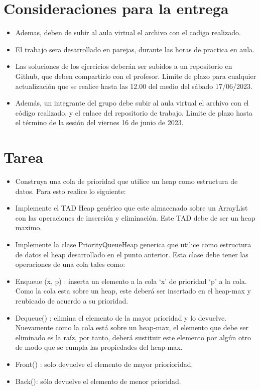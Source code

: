 \documentclass{article}
\begin{document}
	\section{Consideraciones para la entrega}
	\begin{itemize}
		\item Ademas, deben de subir al aula virtual el archivo con el codigo realizado.
		\item El trabajo sera desarrollado en parejas, durante las horas de practica en aula.
		\item Las soluciones de los ejercicios deberán ser subidos a un repositorio en Github, que deben compartirlo
con el profesor. Limite de plazo para cualquier actualización que se realice hasta las 12.00 del medio del
sábado 17/06/2023.
		\item Además, un integrante del grupo debe subir al aula virtual el archivo con el código realizado, y el enlace
del repositorio de trabajo. Limite de plazo hasta el término de la sesión del viernes 16 de junio de 2023.
	
	\end{itemize}
		
	\section{Tarea}
	\begin{itemize}		
		\item Construya una cola de prioridad que utilice un heap como estructura de datos. Para esto realice
lo siguiente:
		\item Implemente el TAD Heap genérico que este almacenado sobre un ArrayList con las operaciones
de inserción y eliminación. Este TAD debe de ser un heap maximo.
		\item Implemente la clase PriorityQueueHeap generica que utilice como estructura de datos el heap
desarrollado en el punto anterior. Esta clase debe tener las operaciones de una cola tales como:
		\item Enqueue (x, p) : inserta un elemento a la cola ‘x’ de prioridad ‘p’ a la cola. Como la
cola esta sobre un heap, este deberá ser insertado en el heap-max y reubicado de
acuerdo a su prioridad.
		\item Dequeue() : elimina el elemento de la mayor prioridad y lo devuelve. Nuevamente
como la cola está sobre un heap-max, el elemento que debe ser eliminado es la raíz,
por tanto, deberá sustituir este elemento por algún otro de modo que se cumpla las
propiedades del heap-max.
		\item Front() : solo devuelve el elemento de mayor priorioridad.
		\item Back(): sólo devuelve el elemento de menor prioridad.
	\end{itemize}
		
\end{document}

